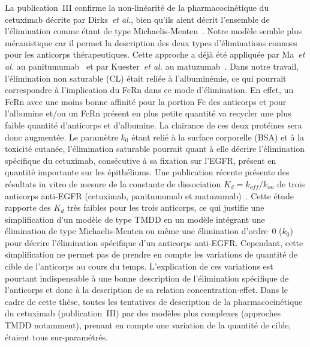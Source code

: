 La publication~III confirme la non-linéarité de la pharmacocinétique du cetuximab décrite par Dirks~\textit{et al.}, bien qu'ils aient décrit l'ensemble de l'élimination comme étant de type Michaelis-Menten~\citep{REF68}. Notre modèle semble plus mécanistique car il permet la description des deux types d'éliminations connues pour les anticorps thérapeutiques. Cette approche a déjà été appliquée par Ma~\textit{et al.} au panitumumab~\citep{REF73} et par Kuester~\textit{et al.} au matuzumab~\citep{REF129}. Dans notre travail, l'élimination non saturable (\gls{CL}) était reliée à l'albuminémie, ce qui pourrait correspondre à l'implication du FcRn dans ce mode d'élimination. En effet, un FcRn avec une moins bonne affinité pour la portion Fc des anticorps et pour l'albumine et$/$ou un FcRn présent en plus petite quantité va recycler une plus faible quantité d'anticorps et d'albumine. La clairance de ces deux protéines sera donc augmentée. Le paramètre $k_0$ étant relié à la surface corporelle (BSA) et à la toxicité cutanée, l'élimination saturable pourrait quant à elle décrire l'élimination spécifique du cetuximab, consécutive à sa fixation sur l'EGFR, présent en quantité importante sur les épithéliums. Une publication récente présente des résultats in vitro de mesure de la constante de dissociation $K_d = k_{off}/k_{on}$ de trois anticorps anti-EGFR (cetuximab, panitumumab et matuzumab)~\citep{REF144}. Cette étude rapporte des $K_d$ très faibles pour les trois anticorps, ce qui justifie une simplification d'un modèle de type TMDD en un modèle intégrant une élimination de type Michaelis-Menten ou même une élimination d'ordre~0 ($k_0$) pour décrire l'élimination spécifique d'un anticorps anti-EGFR. Cependant, cette simplification ne permet pas de prendre en compte les variations de quantité de cible de l'anticorps au cours du temps. L'explication de ces variations est pourtant indispensable à une bonne description de l'élimination spécifique de l'anticorps et donc à la description de sa relation concentration-effet. Dans le cadre de cette thèse, toutes les tentatives de description de la pharmacocinétique du cetuximab (publication~III) par des modèles plus complexes (approches TMDD notamment), prenant en compte une variation de la quantité de cible, étaient tous sur-paramétrés.


